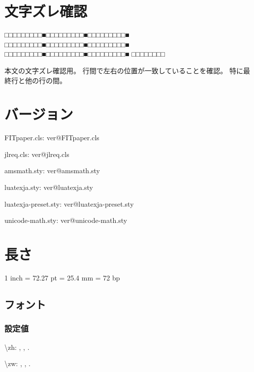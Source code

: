 \documentclass{FITpaper}
\begin{document}
\maketitle

\section{文字ズレ確認}

□□□□□□□□□■□□□□□□□□□■□□□□□□□□□■
□□□□□□□□□■□□□□□□□□□■□□□□□□□□□■
□□□□□□□□□■□□□□□□□□□■□□□□□□□□□■
□□□□□□□□

本文の文字ズレ確認用。
行間で左右の位置が一致していることを確認。
特に最終行と他の行の間。

\section{バージョン}

\makeatletter
FITpaper.cls: \csname ver@FITpaper.cls\endcsname\par
jlreq.cls: \csname ver@jlreq.cls\endcsname\par
amsmath.sty: \csname ver@amsmath.sty\endcsname\par
\ifx\luatexversion\@undefined
\else
luatexja.sty: \csname ver@luatexja.sty\endcsname\par
luatexja-preset.sty: \csname ver@luatexja-preset.sty\endcsname\par
unicode-math.sty: \csname ver@unicode-math.sty\endcsname\par
\fi
\makeatother

\section{長さ}

1 inch = 72.27 pt = 25.4 mm = 72 bp

\subsection{フォント}

\subsubsection{設定値}

\newlength{\myzh}
\setlength{\myzh}{1\zh}
\textbackslash zh:
\prntlen{\myzh},
\prntlen{\myzh},
\prntlen{\myzh}.

\newlength{\myzw}
\setlength{\myzw}{1\zw}
\textbackslash zw:
\prntlen{\myzw},
\prntlen{\myzw},
\prntlen{\myzw}.
\end{document}
